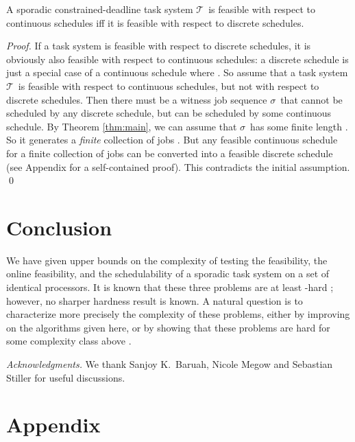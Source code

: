 \documentclass{llncs}
\newcommand{\tsys}{\ensuremath{\mathcal{T}}}
\newcommand{\seq}{\ensuremath{\sigma}}
\newcommand{\conp}{\ccconp}
\begin{document}
\begin{theorem}
\label{thm:continuous}
A sporadic constrained-deadline task system \tsys\ is feasible with respect to continuous schedules iff it is feasible with respect to discrete schedules. 
\end{theorem}
\begin{proof}
If a task system is feasible with respect to discrete schedules, it is obviously also feasible with respect to continuous schedules: a discrete schedule is just a special case of a continuous schedule where . So assume that a task system \tsys\ is feasible with respect to continuous schedules, but not with respect to discrete schedules. Then there must be a witness job sequence \seq\ that cannot be scheduled by any discrete schedule, but can be scheduled by some continuous schedule. By Theorem \ref{thm:main}, we can assume that \seq\ has some finite length . So it generates a \emph{finite} collection of jobs . But any feasible continuous schedule for a finite collection of jobs can be converted into a feasible discrete schedule \cite{Baruah:1996,Baruah:1990,Horn:1974} (see Appendix for a self-contained proof). This contradicts the initial assumption. 
\qed
\end{proof}


\section{Conclusion}
\label{sec:conclusion}
We have given upper bounds on the complexity of testing the feasibility, the online feasibility, and the schedulability of a sporadic task system on a set of identical processors. It is known that these three problems are at least \conp-hard \cite{Eisenbrand:2010}; however, no sharper hardness result is known. A natural question is to characterize more precisely the complexity of these problems, either by improving on the algorithms given here, or by showing that these problems are hard for some complexity class above \conp. 



\emph{Acknowledgments.}
We thank Sanjoy K.\ Baruah, Nicole Megow and Sebastian Stiller for useful discussions. 
\vspace{-0.3cm}




\newpage
\appendix
\section{Appendix}
\end{document}
